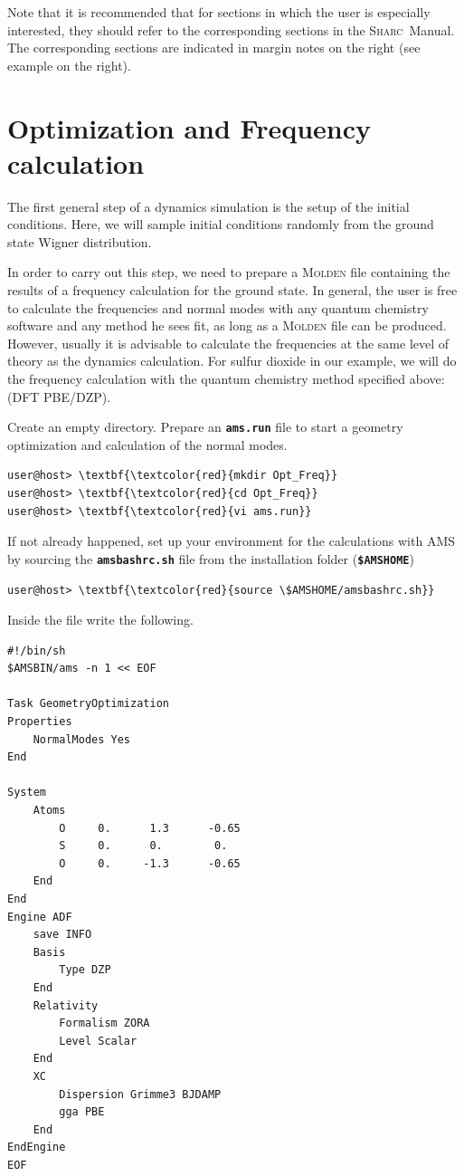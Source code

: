 \documentclass[a4paper,11pt,DIV=15,openany]{scrbook}
\makeatletter
\newcommand{\refermanual}[2][rectangle,draw=B,thick,fill=black!5,inner sep=1pt,outer sep=0pt,rounded corners]{\marginpar{\tikz[baseline=(current bounding box.north)]\node at (0,0) [#1]{\begin{tabular}{@{}l@{}}See\\ section\\ \ref*{#2}\\ (p. \pageref*{#2})\\ in the\\ manual.\end{tabular}};}}
\newcommand{\sharc}{\textsc{Sharc}}
\newcommand{\ttt}[1]{\textbf{\texttt{#1}}}
\makeatother
\begin{document}
\refermanual{m-chap:aux}
Note that it is recommended that for sections in which the user is especially interested, they should refer to the corresponding sections in the \sharc\ Manual.
The corresponding sections are indicated in margin notes on the right (see example on the right).



\clearpage
\section{Optimization and Frequency calculation}\label{tut:optfreq}

The first general step of a dynamics simulation is the setup of the initial conditions.
Here, we will sample initial conditions randomly from the ground state Wigner distribution.

In order to carry out this step, we need to prepare a \textsc{Molden} file containing the results of a frequency calculation for the ground state.
In general, the user is free to calculate the frequencies and normal modes with any quantum chemistry software and any method he sees fit, as long as a \textsc{Molden} file can be produced. 
However, usually it is advisable to calculate the frequencies at the same level of theory as the dynamics calculation. 
For sulfur dioxide in our example, we will do the frequency calculation with the quantum chemistry method specified above: (DFT PBE/DZP). 

Create an empty directory. 
Prepare an \ttt{ams.run} file to start a geometry optimization and calculation of the normal modes.
\begin{Verbatim}[commandchars=\\\{\}]
user@host> \textbf{\textcolor{red}{mkdir Opt_Freq}}
user@host> \textbf{\textcolor{red}{cd Opt_Freq}}
user@host> \textbf{\textcolor{red}{vi ams.run}}
\end{Verbatim}
If not already happened, set up your environment for the calculations with \textsc{AMS} by sourcing the \ttt{amsbashrc.sh} file from the installation folder (\ttt{\$AMSHOME})
\begin{Verbatim}[commandchars=\\\{\}]
  user@host> \textbf{\textcolor{red}{source \$AMSHOME/amsbashrc.sh}}
  \end{Verbatim}
Inside the file write the following.
\begin{oframed}
\footnotesize\begin{Verbatim}[commandchars=\\\{\}]
#!/bin/sh 
$AMSBIN/ams -n 1 << EOF 
 
Task GeometryOptimization 
Properties 
    NormalModes Yes 
End 
 
System 
    Atoms 
        O     0.      1.3      -0.65
        S     0.      0.        0.
        O     0.     -1.3      -0.65
    End 
End 
Engine ADF 
    save INFO 
    Basis 
        Type DZP 
    End 
    Relativity 
        Formalism ZORA 
        Level Scalar 
    End 
    XC
        Dispersion Grimme3 BJDAMP
        gga PBE
    End 
EndEngine
EOF
\end{Verbatim}
\end{oframed}
\end{document}
